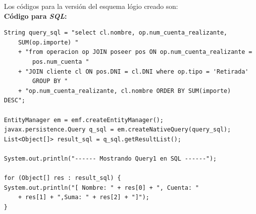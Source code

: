 \documentclass[11pt,a4paper]{article}
\begin{document}
\bigbreak

Los códigos para la versión del esquema lógio creado son:\\
\bigbreak
\textbf{Código para \textit{SQL}:}
\begin{lstlisting}
String query_sql = "select cl.nombre, op.num_cuenta_realizante, 
	SUM(op.importe) "
	+ "from operacion op JOIN poseer pos ON op.num_cuenta_realizante =
		pos.num_cuenta "
	+ "JOIN cliente cl ON pos.DNI = cl.DNI where op.tipo = 'Retirada' 
		GROUP BY "
	+ "op.num_cuenta_realizante, cl.nombre ORDER BY SUM(importe) DESC";

EntityManager em = emf.createEntityManager();
javax.persistence.Query q_sql = em.createNativeQuery(query_sql);
List<Object[]> result_sql = q_sql.getResultList();

System.out.println("------ Mostrando Query1 en SQL ------");

for (Object[] res : result_sql) {
System.out.println("[ Nombre: " + res[0] + ", Cuenta: " 
	+ res[1] + ",Suma: " + res[2] + "]");
}
\end{lstlisting}
\end{document}
